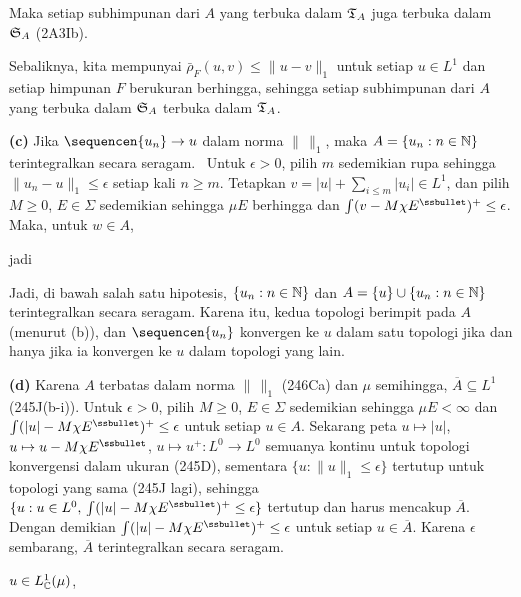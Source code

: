{\noindent Maka setiap subhimpunan dari $A$ yang terbuka dalam $\frak T_A$
juga terbuka dalam $\frak S_A$ (2A3Ib).

\medskip

 Sebaliknya, kita mempunyai $\bar\rho_F(u,v)\le\|u-v\|_1$
untuk setiap $u\in L^1$ dan setiap himpunan $F$ berukuran berhingga,
sehingga setiap subhimpunan dari $A$ yang terbuka dalam $\frak S_A$
terbuka dalam $\frak T_A$.

\medskip

{\bf (c)} Jika $\sequencen{u_n}\to u$ dalam norma $\|\,\|_1$, maka
$A=\{u_n:n\in\Bbb N\}$ terintegralkan secara seragam. \Prf\ Untuk
$\epsilon>0$,
pilih $m$ sedemikian rupa sehingga $\|u_n-u\|_1\le\epsilon$ setiap kali
$n\ge m$. Tetapkan $v=|u|+\sum_{i\le m}|u_i|\in L^1$, dan pilih $M\ge 0$,
$E\in\Sigma$ sedemikian sehingga $\mu E$ berhingga dan
$\int(v-M\chi E^{\ssbullet})^+\le\epsilon$. Maka, untuk $w\in A$,


\noindent jadi


Jadi, di bawah salah satu hipotesis, $\{u_n:n\in\Bbb N\}$ dan
$A=\{u\}\cup\{u_n:n\in\Bbb N\}$ terintegralkan secara seragam. Karena itu,
kedua topologi berimpit pada $A$ (menurut (b)), dan
$\sequencen{u_n}$ konvergen
ke $u$ dalam satu topologi jika dan hanya jika ia konvergen ke $u$ dalam
topologi yang lain.

\medskip

{\bf (d)} Karena $A$ terbatas dalam norma $\|\,\|_1$ (246Ca) dan $\mu$
semihingga, $\overline{A}\subseteq L^1$ (245J(b-i)). Untuk
$\epsilon>0$, pilih $M\ge 0$, $E\in\Sigma$ sedemikian sehingga $\mu
E<\infty$ dan $\int(|u|-M\chi E^{\ssbullet})^+\le\epsilon$ untuk setiap $u\in
A$.   Sekarang peta $u\mapsto|u|$, $u\mapsto u-M\chi E^{\ssbullet}$, $u\mapsto
u^+:L^0\to L^0$ semuanya kontinu untuk topologi konvergensi dalam ukuran
(245D), sementara $\{u:\|u\|_1\le\epsilon\}$ tertutup untuk topologi yang sama
(245J lagi), sehingga $\{u:u\in L^0,\,\int(|u|-M\chi
E^{\ssbullet})^+\le\epsilon\}$ tertutup dan harus mencakup $\overline{A}$.
Dengan demikian $\int(|u|-M\chi E^{\ssbullet})^+\le\epsilon$ untuk setiap
$u\in\overline{A}$. Karena $\epsilon$ sembarang, $\overline{A}$
terintegralkan secara seragam.
}%

 $u\in
L^1_{\Bbb C}(\mu)$, 

